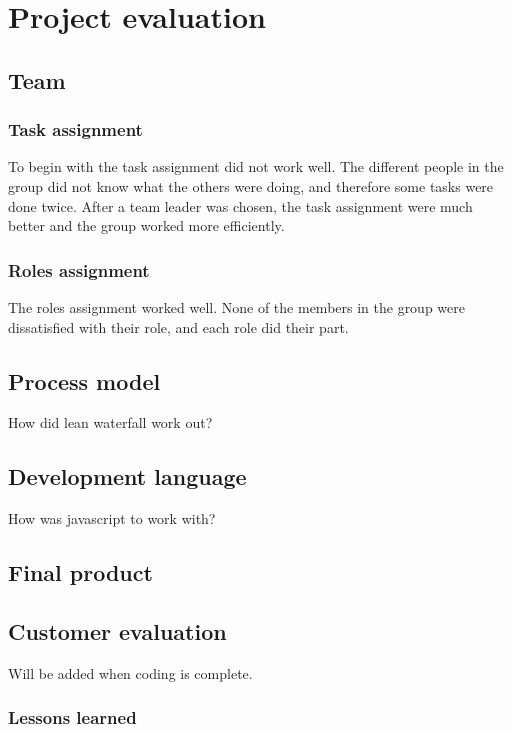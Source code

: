 \chapter{Project evaluation}

\section{Team}

\subsection*{Task assignment}
To begin with the task assignment did not work well. The different people in 
the group did not know what the others were doing, and therefore some tasks were done twice.
After a team leader was chosen, the task assignment were much better and the group worked more efficiently. 

\subsection*{Roles assignment}
The roles assignment worked well. None of the members in the group were dissatisfied with their role, and each role
did their part.
\section{Process model}

How did lean waterfall work out?

\section{Development language}

How was javascript to work with?

\section{Final product}

\section{Customer evaluation}

Will be added when coding is complete.

\subsection{Lessons learned}

